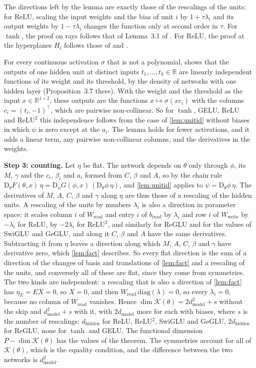 \documentclass[10pt]{article}
\theoremstyle{definition}
\theoremstyle{remark}
\newcommand{\R}{\mathbb{R}}
\newcommand{\Wread}{W_{\mathrm{read}}}
\newcommand{\Wwrite}{W_{\mathrm{write}}}
\newcommand{\dm}{d_{\mathrm{model}}}
\newcommand{\dhid}{d_{\mathrm{hidden}}}
\newcommand{\Der}{\mathrm{D}}
\newcommand{\para}[1]{\smallskip\noindent\textbf{#1}\hspace{0.5em}}
\begin{document}
The directions left by the lemma are exactly those of the rescalings of the units: for ReLU, scaling the input weights and the bias of unit $i$ by $1 + \tau\lambda_i$ and its output weights by $1 - \tau\lambda_i$ changes the function only at second order in $\tau$. For $\tanh$, the proof on rays follows that of Lemma~3.1 of \citet{sussmann1992}. For ReLU, the proof at the hyperplanes $H_i$ follows those of \citet[Lemma~2]{petzka2020symmetries} and \citet[Theorem~6]{stock2021embedding}.

For every continuous activation $\sigma$ that is not a polynomial, \citet[proof of Theorem~5.1]{pinkus1999approximation} shows that the outputs of one hidden unit at distinct inputs $t_1, \dots, t_k \in \R$ are linearly independent functions of its weight and its threshold, by the density of networks with one hidden layer (Proposition~3.7 there). With the weight and the threshold as the input $x \in \R^{1\times2}$, these outputs are the functions $x \mapsto \sigma(xc_i)$ with the columns $c_i = (t_i, -1)^\top$, which are pairwise non-collinear. So for $\tanh$, GELU, ReLU and ReLU$^2$ this independence follows from the case of \cref{lem:unitid} without biases in which $\psi$ is zero except at the $a_i$. The lemma holds for fewer activations, and it adds a linear term, any pairwise non-collinear columns, and the derivatives in the weights.

\para{Step 3: counting.} Let $\eta$ be flat. The network depends on $\theta$ only through $\phi$, its $M$, $\gamma$ and the $c_i$, $\beta_i$ and $a_i$ formed from $C$, $\beta$ and $A$, so by the chain rule $\Der_\theta F(\theta, x)\,\eta = \Der_\phi G(\phi, x)\,(\Der_\theta\phi\,\eta)$, and \cref{lem:unitid} applies to $\psi = \Der_\theta\phi\,\eta$. The derivatives of $M$, $A$, $C$, $\beta$ and $\gamma$ along $\eta$ are thus those of a rescaling of the hidden units. A rescaling of the units by numbers $\lambda_i$ is also a direction in parameter space: it scales column $i$ of $\Wread$ and entry $i$ of $b_{\mathrm{read}}$ by $\lambda_i$ and row $i$ of $\Wwrite$ by $-\lambda_i$ for ReLU, by $-2\lambda_i$ for ReLU$^2$, and similarly for ReGLU and for the values of SwiGLU and GeGLU, and along it $C$, $\beta$ and $A$ have the same derivatives. Subtracting it from $\eta$ leaves a direction along which $M$, $A$, $C$, $\beta$ and $\gamma$ have derivative zero, which \cref{lem:fact} describes. So every flat direction is the sum of a direction of the changes of basis and translations of \cref{lem:fact} and a rescaling of the units, and conversely all of these are flat, since they come from symmetries. The two kinds are independent: a rescaling that is also a direction of \cref{lem:fact} has $\eta_E = EX = 0$, so $X = 0$, and then $\Wread\,\mathrm{diag}(\lambda) = 0$, so every $\lambda_i = 0$, because no column of $\Wread$ vanishes. Hence $\dim\mathcal K(\theta) = 2\dm^2 + s$ without the skip and $\dm^2 + s$ with it, with $2\dm$ more for each with biases, where $s$ is the number of rescalings: $\dhid$ for ReLU, ReLU$^2$, SwiGLU and GeGLU, $2\dhid$ for ReGLU, none for $\tanh$ and GELU. The functional dimension $P - \dim\mathcal K(\theta)$ has the values of the theorem. The symmetries account for all of $\mathcal K(\theta)$, which is the equality condition, and the difference between the two networks is $\dm^2$.
\end{document}
